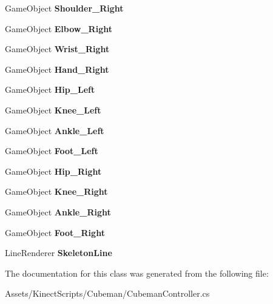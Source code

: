 \begin{DoxyCompactItemize}
\item 
\mbox{\label{class_cubeman_controller_ae37497dce80b3cae3768f4311a840ccf}} 
Game\+Object {\bfseries Shoulder\+\_\+\+Right}
\item 
\mbox{\label{class_cubeman_controller_a9f214d7876636e1769013801050c37fa}} 
Game\+Object {\bfseries Elbow\+\_\+\+Right}
\item 
\mbox{\label{class_cubeman_controller_ad5d996698eb02cfdc6e638e7fc007bda}} 
Game\+Object {\bfseries Wrist\+\_\+\+Right}
\item 
\mbox{\label{class_cubeman_controller_a1568192ea27941e0a12cbc99ef936d93}} 
Game\+Object {\bfseries Hand\+\_\+\+Right}
\item 
\mbox{\label{class_cubeman_controller_a8da663e72ba0608259276ce8d5f7feb2}} 
Game\+Object {\bfseries Hip\+\_\+\+Left}
\item 
\mbox{\label{class_cubeman_controller_a32e3d803083c2f6972216c1f57c2141c}} 
Game\+Object {\bfseries Knee\+\_\+\+Left}
\item 
\mbox{\label{class_cubeman_controller_a59abc75c4e5aab80880d635c570ce745}} 
Game\+Object {\bfseries Ankle\+\_\+\+Left}
\item 
\mbox{\label{class_cubeman_controller_a8d8d5bbc904212cc91fc45b4e84366f4}} 
Game\+Object {\bfseries Foot\+\_\+\+Left}
\item 
\mbox{\label{class_cubeman_controller_a364f94bcbf2244a207b0ac785b4ae243}} 
Game\+Object {\bfseries Hip\+\_\+\+Right}
\item 
\mbox{\label{class_cubeman_controller_aeb722d0a534a5d114077a821ee070717}} 
Game\+Object {\bfseries Knee\+\_\+\+Right}
\item 
\mbox{\label{class_cubeman_controller_ac6a2b700f08152f22027bf0299d49ecc}} 
Game\+Object {\bfseries Ankle\+\_\+\+Right}
\item 
\mbox{\label{class_cubeman_controller_ae9b9b471de8a3523564923f9e6e7b717}} 
Game\+Object {\bfseries Foot\+\_\+\+Right}
\item 
\mbox{\label{class_cubeman_controller_af2ff8f58e07e8476f11c52194f5dca98}} 
Line\+Renderer {\bfseries Skeleton\+Line}
\end{DoxyCompactItemize}


The documentation for this class was generated from the following file\+:\begin{DoxyCompactItemize}
\item 
Assets/\+Kinect\+Scripts/\+Cubeman/Cubeman\+Controller.\+cs\end{DoxyCompactItemize}
